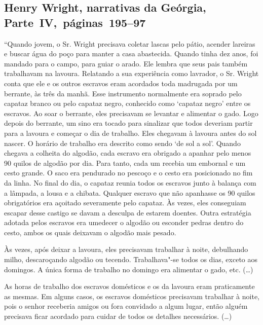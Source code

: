 \subsection{Henry Wright, narrativas da Geórgia, Parte~IV,~páginas~195--97}
\label{ref316}

``Quando jovem, o Sr. Wright precisava coletar lascas pelo pátio,
acender lareiras e buscar água do poço para manter a casa abastecida.
Quando tinha dez anos, foi mandado para o campo, para guiar o arado. Ele
lembra que seus pais também trabalhavam na lavoura. Relatando a sua
experiência como lavrador, o Sr. Wright conta que ele e os outros
escravos eram acordados toda madrugada por um berrante, às três da
manhã. Esse instrumento normalmente era soprado pelo capataz branco ou
pelo capataz negro, conhecido como `capataz negro' entre os escravos. Ao
soar o berrante, eles precisavam se levantar e alimentar o gado. Logo
depois do berrante, um sino era tocado para sinalizar que todos deveriam
partir para a lavoura e começar o dia de trabalho. Eles chegavam à
lavoura antes do sol nascer. O horário de trabalho era descrito como
sendo `de sol a sol'. Quando chegava a colheita do algodão, cada escravo
era obrigado a apanhar pelo menos 90 quilos de algodão por dia. Para tanto,
cada um recebia um embornal e um cesto grande. O saco era pendurado no
pescoço e o cesto era posicionado no fim da linha. No final do dia, o
capataz reunia todos os escravos junto à balança com a lâmpada, a lousa
e a chibata. Qualquer escravo que não apanhasse os 90 quilos obrigatórios
era açoitado severamente pelo capataz. Às vezes, eles conseguiam escapar
desse castigo se davam a desculpa de estarem doentes. Outra estratégia
adotada pelos escravos era umedecer o algodão ou esconder pedras dentro
do cesto, ambos os quais deixavam o algodão mais pesado.

Às vezes, após deixar a lavoura, eles precisavam trabalhar à noite,
debulhando milho, descaroçando algodão ou tecendo. Trabalhava"-se todos
os dias, exceto aos domingos. A única forma de trabalho no domingo era
alimentar o gado, etc. (\ldots{})

As horas de trabalho dos escravos domésticos e os da lavoura eram
praticamente as mesmas. Em alguns casos, os escravos domésticos
precisavam trabalhar à noite, pois o senhor receberia amigos ou fora
convidado a algum lugar, então alguém precisava ficar acordado para
cuidar de todos os detalhes necessários. (\ldots{})

